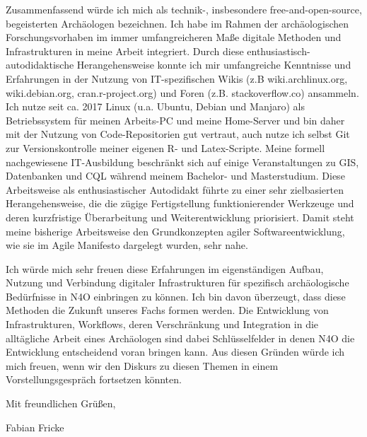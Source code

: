 \documentclass[10pt, a4paper]{article}
\begin{document}
Zusammenfassend würde ich mich als technik-, insbesondere free-and-open-source, begeisterten Archäologen bezeichnen. Ich habe im Rahmen der archäologischen Forschungsvorhaben im immer umfangreicheren Maße digitale Methoden und Infrastrukturen in meine Arbeit integriert. Durch diese enthusiastisch-autodidaktische Herangehensweise konnte ich mir umfangreiche Kenntnisse und Erfahrungen in der Nutzung von IT-spezifischen Wikis (z.B wiki.archlinux.org, wiki.debian.org, cran.r-project.org) und Foren (z.B. stackoverflow.co) ansammeln. Ich nutze seit ca. 2017 Linux (u.a. Ubuntu, Debian und Manjaro) als Betriebssystem für meinen Arbeits-PC und meine Home-Server und bin daher mit der Nutzung von Code-Repositorien gut vertraut, auch nutze ich selbst Git zur Versionskontrolle meiner eigenen R- und Latex-Scripte. Meine formell nachgewiesene IT-Ausbildung beschränkt sich auf einige Veranstaltungen zu GIS, Datenbanken und CQL während meinem Bachelor- und Masterstudium. Diese Arbeitsweise als enthusiastischer Autodidakt führte  zu einer sehr zielbasierten Herangehensweise, die die zügige Fertigstellung funktionierender Werkzeuge und deren kurzfristige Überarbeitung und Weiterentwicklung priorisiert. Damit steht meine bisherige Arbeitsweise den Grundkonzepten agiler Softwareentwicklung, wie sie im Agile Manifesto dargelegt wurden, sehr nahe.

Ich würde mich sehr freuen diese Erfahrungen im eigenständigen Aufbau, Nutzung und Verbindung digitaler Infrastrukturen für spezifisch archäologische Bedürfnisse in N4O einbringen zu können. Ich bin davon überzeugt, dass diese Methoden die Zukunft unseres Fachs formen werden. Die Entwicklung von Infrastrukturen, Workflows, deren Verschränkung und Integration in die alltägliche Arbeit eines Archäologen sind dabei Schlüsselfelder in denen N4O die Entwicklung entscheidend voran bringen kann. Aus diesen Gründen würde ich mich freuen, wenn wir den Diskurs zu diesen Themen in einem Vorstellungsgespräch fortsetzen könnten.

Mit freundlichen Grüßen,

Fabian Fricke
\end{document}
